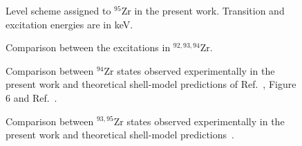 \begin{figure}
\caption[]{Level scheme assigned to $^{95}$Zr in the present work.
 Transition and excitation energies are in keV.} 
\end{figure}

\begin{figure}
\caption[]{ Comparison between the excitations in $^{92,93,94}$Zr.}
\end{figure}


\begin{figure}
\caption[]{ Comparison between $^{94}$Zr states observed experimentally in the present
 work and theoretical shell-model predictions of Ref.~\cite{Glo}, Figure 6 and Ref.~\cite{holt}.} 
\end{figure}

\begin{figure}
\caption[]{ Comparison between $^{93,95}$Zr states observed experimentally in the present
 work and theoretical shell-model predictions~\cite{holt}.}
\end{figure}




